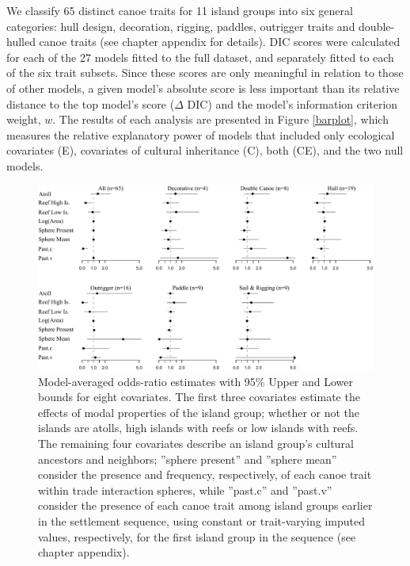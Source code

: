 We classify 65 distinct canoe traits for 11 island groups into six general categories: hull design, decoration, rigging, paddles, outrigger traits and double-hulled canoe traits (see chapter appendix for details).  DIC scores were calculated for each of the 27 models fitted to the full dataset, and separately fitted to each of the six trait subsets.  Since these scores are only meaningful in relation to those of other models, a given model's absolute score is less important than its relative distance to the top model's score ($\Delta$ DIC) and the model's information criterion weight, $w$.  The results of each analysis are presented in Figure \ref{barplot}, which measures the relative explanatory power of models that included only ecological covariates (E), covariates of cultural inheritance (C), both (CE), and the two null models.  



    \begin{figure}[t]
    \begin{center}
      \includegraphics[scale=0.65]{figures/canoes/figOR.pdf}
    \end{center}
    \caption{Model-averaged odds-ratio estimates with 95\% Upper and Lower bounds for eight covariates.  The first three covariates estimate the effects of modal properties of the island group; whether or not the islands are atolls, high islands with reefs or low islands with reefs.  The remaining four covariates describe an island group's cultural ancestors and neighbors; ''sphere present'' and ''sphere mean'' consider the presence and frequency, respectively, of each canoe trait within trade interaction spheres, while ''past.c'' and ''past.v'' consider the presence of each canoe trait among island groups earlier in the settlement sequence, using constant or trait-varying imputed values, respectively, for the first island group in the sequence (see chapter appendix).}
    \label{ORresultsfig}
    \end{figure}
 
